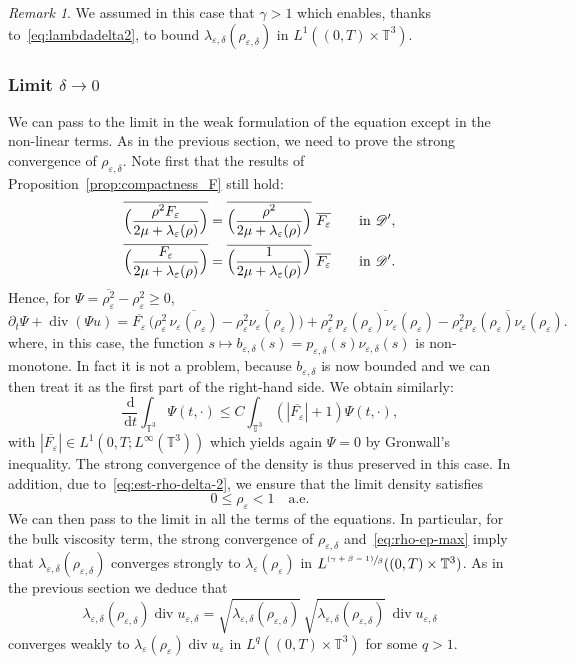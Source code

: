 \documentclass[10pt]{amsart}
\let\mathcal\mathscr
\newcommand{\<}{\bigl\langle}
\renewcommand{\>}{\bigr\rangle}
\newcommand{\psfrac}[2]{\sfrac{(#1)}{#2}}
\newcommand{\labeleq}[1]{}
\theoremstyle{definition}
\theoremstyle{remark}
\newtheorem{remark}{Remark}
\newcommand{\TT}{\mathbb{T}^3}
\DeclareMathOperator{\Div}{div}
\newcommand{\di}{\,\mathrm{d}}
\let\ov\overline
\let\ep\varepsilon
\begin{document}
\begin{remark}
We assumed in this case that $\gamma > 1$ which enables, thanks to~\eqref{eq:lambdadelta2}, to bound $\lambda_{\ep,\delta}(\rho_{\ep,\delta})$ in $L^1((0,T) \times \TT)$.
\end{remark}

\subsubsection*{Limit $\delta \rightarrow 0$}
We can pass to the limit in the weak formulation of the equation except in the non-linear terms.
As in the previous section, we need to prove the strong convergence of $\rho_{\ep,\delta}$.
Note first that the results of Proposition~\ref{prop:compactness_F} still hold:
\begin{align*}\labeleq{prop:compactness_F_1-2}
\ov{\Bigl(\dfrac{\rho^2 F_\ep}{2\mu +\lambda_\ep(\rho)} \Bigr)} &= \ov{\Bigl(\dfrac{\rho^2}{2\mu +\lambda_\ep(\rho)} \Bigr)}~ \ov{F_\ep}\qquad \text{in } \mathcal{D}',\\\labeleq{prop:compactness_F_2-2}
\ov{\Bigl(\dfrac{F_\ep}{2\mu +\lambda_\ep(\rho)} \Bigr)} &= \ov{\Bigl(\dfrac{1}{2\mu +\lambda_\ep(\rho)} \Bigr)}~ \ov{F_\ep}\qquad \text{in } \mathcal{D}'.
\end{align*}
Hence, for $\Psi = \ov{\rho_\ep^2} - \rho_\ep^2 \geq 0$,
\[\labeleq{Psi-2}
\partial_t \Psi + \Div(\Psi u)
= \ov{ F_\ep } \, \bigl(\rho_\ep^2 \,\ov{\nu_\ep(\rho_\ep)} - \ov{\rho_\ep^2 \nu_\ep(\rho_\ep)} \bigr) 
 + \rho_\ep^2\, \ov{ p_\ep(\rho_\ep) \nu_\ep(\rho_\ep) } - \ov{ \rho_\ep^2 p_\ep(\rho_\ep) \nu_\ep(\rho_\ep) }.
\]
where, in this case, the function $s \mapsto b_{\ep,\delta}(s) = p_{\ep,\delta}(s) \nu_{\ep,\delta}(s)$ is non-monotone.
In fact it is not a problem, because $b_{\ep,\delta}$ is now bounded and we can then treat it as the first part of the right-hand side.
We obtain similarly:
\begin{equation*}
\dfrac{\di}{\di t} \int_{\TT}{\Psi(t,\cdot)}
\leq C \int_{\TT}{(|\ov{F_\ep}|+1)\Psi(t,\cdot)},
\end{equation*}
with $|\ov{F_\ep}|\in L^1(0,T;L^\infty(\TT))$ which yields again $\Psi = 0$ by Gronwall's inequality.
The strong convergence of the density is thus preserved in this case.
In addition, due to~\eqref{eq:est-rho-delta-2}, we ensure that the limit density satisfies
\begin{equation}\label{eq:rho-ep-max}
0\leq \rho_{\ep} < 1 \quad \text{a.e.}
\end{equation}
We can then pass to the limit in all the terms of the equations.
In particular, for the bulk viscosity term, the strong convergence of $\rho_{\ep,\delta}$ and~\eqref{eq:rho-ep-max} imply that $\lambda_{\ep,\delta}(\rho_{\ep,\delta})$ converges strongly to $\lambda_\ep(\rho_\ep)$ in $L^{\psfrac{\gamma + \beta -1}{\beta}}((0,T)\times \TT)$.
As in the previous section we deduce that
\[
\lambda_{\ep,\delta}(\rho_{\ep,\delta})\Div u_{\ep,\delta}
= \sqrt{\lambda_{\ep,\delta}(\rho_{\ep,\delta})}\,\sqrt{\lambda_{\ep,\delta}(\rho_{\ep,\delta})}\,\Div u_{\ep,\delta}
\]
converges weakly to $\lambda_\ep(\rho_\ep)\Div u_\ep$ in $L^q((0,T)\times \TT)$ for some $q>1$.
\end{document}
